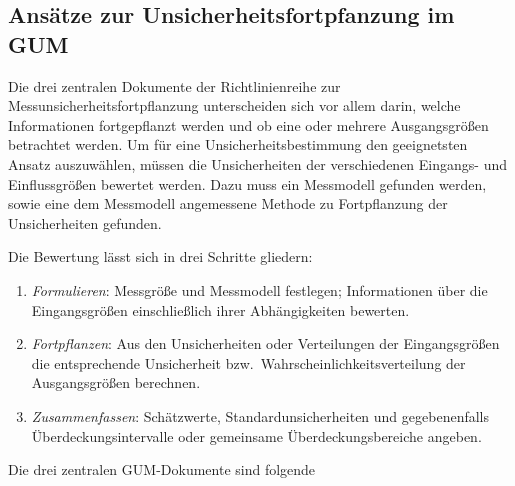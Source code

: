 \subsection{Ansätze zur Unsicherheitsfortpfanzung im GUM}

Die drei zentralen Dokumente  der Richtlinienreihe zur Messunsicherheitsfortpflanzung unterscheiden sich vor allem darin, welche Informationen
fortgepflanzt werden und ob eine oder mehrere Ausgangsgrößen betrachtet
werden. Um für eine Unsicherheitsbestimmung den geeignetsten Ansatz auszuwählen, müssen die Unsicherheiten der verschiedenen Eingangs- und Einflussgrößen bewertet werden. Dazu muss ein Messmodell gefunden werden, sowie eine dem Messmodell angemessene Methode zu Fortpflanzung der Unsicherheiten gefunden.

Die Bewertung lässt sich in drei Schritte gliedern:
\begin{enumerate}
\item \textsl{Formulieren}: Messgröße und Messmodell festlegen;
Informationen über die Eingangsgrößen einschließlich ihrer Abhängigkeiten
bewerten.
\item \textsl{Fortpflanzen}: Aus den Unsicherheiten oder Verteilungen der
Eingangsgrößen die entsprechende Unsicherheit bzw.\ Wahrscheinlichkeitsverteilung der Ausgangsgrößen berechnen.
\item \textsl{Zusammenfassen}: Schätzwerte, Standardunsicherheiten und
gegebenenfalls Überdeckungsintervalle oder gemeinsame Überdeckungsbereiche
angeben.
\end{enumerate}

Die drei zentralen GUM-Dokumente sind folgende

